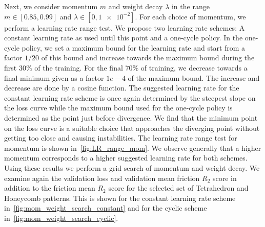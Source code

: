 Next, we consider momentum $m$ and weight decay $\lambda$ in the range $m \in
[0.85, 0.99]$ and $\lambda \in [0, \num{1e-2}]$. For each choice of momentum, we
perform a learning rate range test. We propose two learning rate schemes: A
constant learning rate as used until this point and a one-cycle policy. In the
one-cycle policy, we set a maximum bound for the learning rate and start from a
factor $1/20$ of this bound and increase towards the maximum bound during the
first 30\% of the training. For the final 70\% of training, we decrease towards
a final minimum given as a factor $1e-4$ of the maximum bound. The increase and
decrease are done by a cosine function. The suggested learning rate for the
constant learning rate scheme is once again determined by the steepest slope on
the loss curve while the maximum bound used for the one-cycle policy is
determined as the point just before divergence. We find that the minimum point
on the loss curve is a suitable choice that approaches the diverging point
without getting too close and causing instabilities. The learning rate range
test for momentum is shown in~\cref{fig:LR_range_mom}. We observe generally that
a higher momentum corresponds to a higher suggested learning rate for both
schemes. Using these results we perform a grid search of momentum and weight
decay. We examine again the validation loss and validation mean friction $R_2$
score in addition to the friction mean $R_2$ score for the selected set of
Tetrahedron and Honeycomb patterns. This is shown for the constant learning rate
scheme in~\cref{fig:mom_weight_search_constant} and for the cyclic scheme
in~\cref{fig:mom_weight_search_cyclic}.

